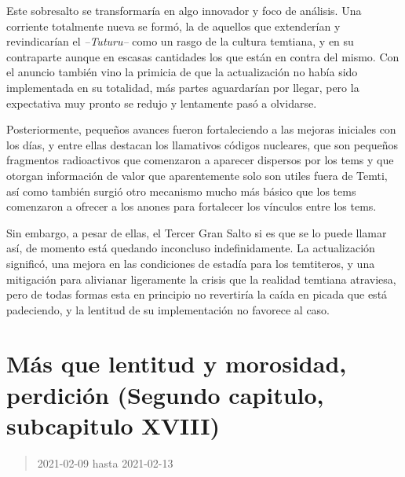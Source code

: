\documentclass[
  spanish,
]{book}
\begin{document}
Este sobresalto se transformaría en algo innovador y foco de análisis. Una corriente totalmente nueva se formó, la de aquellos que extenderían y revindicarían el \emph{--Tuturu--} como un rasgo de la cultura temtiana, y en su contraparte aunque en escasas cantidades los que están en contra del mismo. Con el anuncio también vino la primicia de que la actualización no había sido implementada en su totalidad, más partes aguardarían por llegar, pero la expectativa muy pronto se redujo y lentamente pasó a olvidarse.

Posteriormente, pequeños avances fueron fortaleciendo a las mejoras iniciales con los días, y entre ellas destacan los llamativos códigos nucleares, que son pequeños fragmentos radioactivos que comenzaron a aparecer dispersos por los tems y que otorgan información de valor que aparentemente solo son utiles fuera de Temti, así como también surgió otro mecanismo mucho más básico que los tems comenzaron a ofrecer a los anones para fortalecer los vínculos entre los tems.

Sin embargo, a pesar de ellas, el Tercer Gran Salto si es que se lo puede llamar así, de momento está quedando inconcluso indefinidamente. La actualización significó, una mejora en las condiciones de estadía para los temtiteros, y una mitigación para alivianar ligeramente la crisis que la realidad temtiana atraviesa, pero de todas formas esta en principio no revertiría la caída en picada que está padeciendo, y la lentitud de su implementación no favorece al caso.

\hypertarget{muxe1s-que-lentitud-y-morosidad-perdiciuxf3n-segundo-capitulo-subcapitulo-xviii}{%
\section{Más que lentitud y morosidad, perdición (Segundo capitulo, subcapitulo XVIII)}\label{muxe1s-que-lentitud-y-morosidad-perdiciuxf3n-segundo-capitulo-subcapitulo-xviii}}

\begin{quote}
2021-02-09 hasta 2021-02-13
\end{quote}
\end{document}
